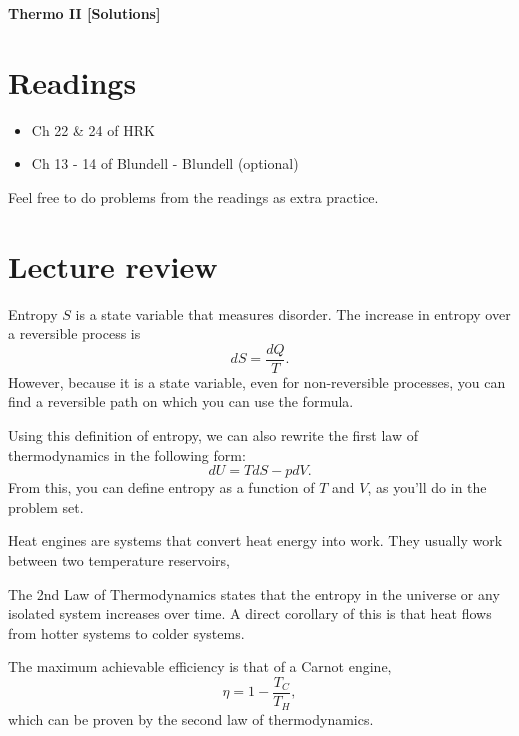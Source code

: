 \documentclass[11pt]{scrartcl}
\title{\titlee}
\author{Cambridge Physics Academy}
\date{2023-2024}
\newcommand{\titlee}{Thermo II [Solutions]}
\begin{document}
\thispagestyle{empty}
\begin{center}
    
    
    \Huge \textbf{\textsf{\titlee}}

    \large \theauthor
\end{center}

\setcounter{section}{-1}
\section{Readings}
\begin{itemize}
    \item Ch 22 \& 24 of HRK
    \item Ch 13 - 14 of Blundell - Blundell (optional)
\end{itemize}
Feel free to do problems from the readings as extra practice.


\section{Lecture review}

\begin{defn}[Entropy]
    Entropy $S$ is a state variable that measures disorder. The increase in entropy over a reversible process is
    $$dS = \frac{dQ}{T}.$$
    However, because it is a state variable, even for non-reversible processes, you can find a reversible path on which you can use the formula.
\end{defn}

Using this definition of entropy, we can also rewrite the first law of thermodynamics in the following form:
$$dU = TdS - pdV.$$
From this, you can define entropy as a function of $T$ and $V$, as you'll do in the problem set.

\begin{defn}
    Heat engines are systems that convert heat energy into work. They usually work between two temperature reservoirs,
\end{defn}

\begin{theorem}
    The 2nd Law of Thermodynamics states that the entropy in the universe or any isolated system increases over time. A direct corollary of this is that heat flows from hotter systems to colder systems.
\end{theorem}

\begin{theorem}
    The maximum achievable efficiency is that of a Carnot engine,
    $$\eta = 1 - \frac{T_C}{T_H},$$
    which can be proven by the second law of thermodynamics.
\end{theorem}
\end{document}
